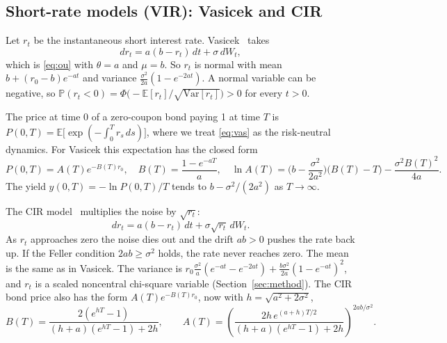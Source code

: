 \documentclass[11pt]{article}
\newcommand{\E}{\mathbb{E}}
\newcommand{\Var}{\mathrm{Var}}
\begin{document}
\subsection{Short-rate models (VIR): Vasicek and CIR}

Let $r_t$ be the instantaneous short interest rate. Vasicek~\cite{vasicek1977} takes
\begin{equation}
dr_t=a(b-r_t)\,dt+\sigma\,dW_t ,
\label{eq:vas}
\end{equation}
which is \eqref{eq:ou} with $\theta=a$ and $\mu=b$. So $r_t$ is normal with mean
$b+(r_0-b)e^{-at}$ and variance $\frac{\sigma^2}{2a}(1-e^{-2at})$. A normal variable can be
negative, so $\mathbb P(r_t<0)=\Phi\big(-\E[r_t]/\sqrt{\Var[r_t]}\big)>0$ for every $t>0$.

The price at time 0 of a zero-coupon bond paying 1 at time $T$ is
$P(0,T)=\E\big[\exp(-\int_0^T r_s\,ds)\big]$, where we treat \eqref{eq:vas} as the
risk-neutral dynamics. For Vasicek this expectation has the closed form
\begin{equation}
P(0,T)=A(T)e^{-B(T)r_0},\quad
B(T)=\frac{1-e^{-aT}}{a},\quad
\ln A(T)=\Big(b-\frac{\sigma^2}{2a^2}\Big)\big(B(T)-T\big)-\frac{\sigma^2B(T)^2}{4a}.
\label{eq:vasbond}
\end{equation}
The yield $y(0,T)=-\ln P(0,T)/T$ tends to $b-\sigma^2/(2a^2)$ as $T\to\infty$.

The CIR model~\cite{cox1985} multiplies the noise by $\sqrt{r_t}$:
\begin{equation}
dr_t=a(b-r_t)\,dt+\sigma\sqrt{r_t}\,dW_t .
\label{eq:cir}
\end{equation}
As $r_t$ approaches zero the noise dies out and the drift $ab>0$ pushes the rate back up. If the
Feller condition $2ab\ge\sigma^2$ holds, the rate never reaches zero. The mean is the same as in
Vasicek. The variance is
$r_0\frac{\sigma^2}{a}(e^{-at}-e^{-2at})+\frac{b\sigma^2}{2a}(1-e^{-at})^2$, and
$r_t$ is a scaled noncentral chi-square variable (Section~\ref{sec:method}). The CIR bond price
also has the form $A(T)e^{-B(T)r_0}$, now with $h=\sqrt{a^2+2\sigma^2}$,
\begin{equation}
B(T)=\frac{2(e^{hT}-1)}{(h+a)(e^{hT}-1)+2h},\qquad
A(T)=\left(\frac{2h\,e^{(a+h)T/2}}{(h+a)(e^{hT}-1)+2h}\right)^{2ab/\sigma^2}.
\label{eq:cirbond}
\end{equation}
\end{document}
